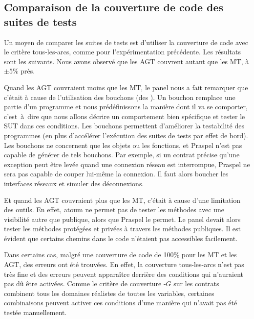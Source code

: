 
\subsection{Comparaison de la couverture de code des suites de tests}
\label{subsection:experimentation:coverage}


Un moyen de comparer les suites de tests est d'utiliser la couverture de code
avec le critère tous-les-arcs, comme pour l'expérimentation précédente.  Les
résultats sont les suivants. Nous avons observé que les AGT couvrent autant que
les MT, à $\pm 5\%$ près.

Quand les AGT couvraient moins que les MT, le panel nous a fait remarquer que
c'était à cause de l'utilisation des bouchons (des ). Un
bouchon remplace une partie d'un programme et nous prédéfinissons la manière
dont il va se comporter, c'est~à~dire que nous allons décrire un comportement
bien spécifique et tester le SUT dans ces conditions.  Les bouchons permettent
d'améliorer la testabilité des programmes (en plus d'accélérer l'exécution des
suites de tests par effet de bord). Les bouchons ne concernent que les objets ou
les fonctions, et Praspel n'est pas capable de générer de tels bouchons. Par
exemple, si un contrat précise qu'une exception peut être levée quand une
connexion réseau est interrompue, Praspel ne sera pas capable de couper lui-même
la connexion. Il faut alors boucher les interfaces réseaux et simuler des
déconnexions.

Et quand les AGT couvraient plus que les MT, c'était à cause d'une limitation
des outils. En effet, atoum ne permet pas de tester les méthodes avec une
visibilité autre que publique, alors que Praspel le permet. Le panel devait
alors tester les méthodes protégées et privées à travers les méthodes publiques.
Il est évident que certains chemins dans le code n'étaient pas accessibles
facilement.

Dans certains cas, malgré une couverture de code de 100\% pour les MT et les
AGT, des erreurs ont été trouvées. En effet, la couverture tous-les-arcs n'est
pas très fine et des erreurs peuvent apparaître derrière des conditions qui
n'auraient pas dû être activées. Comme le critère de couverture
-$G$ sur les contrats combinent tous les domaines réalistes de
toutes les variables, certaines combinaisons peuvent activer ces conditions
d'une manière qui n'avait pas été testée manuellement.

